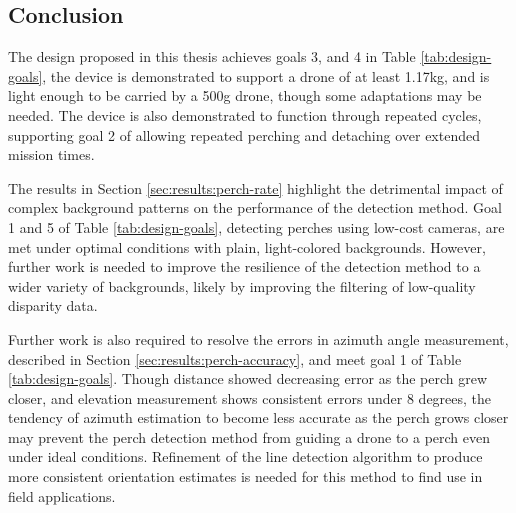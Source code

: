 \subsection{Conclusion}

The design proposed in this thesis achieves goals 3, and 4 in Table \ref{tab:design-goals}, the device is demonstrated
to support a drone of at least 1.17kg, and is light enough to be carried by a 500g drone, though some adaptations may be needed.
The device is also demonstrated to function through repeated cycles, supporting goal 2 of allowing repeated perching and detaching 
over extended mission times.
 
The results in Section \ref{sec:results:perch-rate} highlight the detrimental impact of complex background patterns on the 
performance of the detection method. Goal 1 and 5 of Table \ref{tab:design-goals}, detecting perches using low-cost cameras,
are met under optimal conditions with plain, light-colored backgrounds. However, further work is needed to improve the 
resilience of the detection method to a wider variety of backgrounds, likely by improving the filtering of low-quality 
disparity data.

Further work is also required to resolve the errors in azimuth angle measurement, described in Section \ref{sec:results:perch-accuracy}, 
and meet goal 1 of Table \ref{tab:design-goals}. Though distance showed decreasing error as the perch grew closer, and elevation measurement
shows consistent errors under 8 degrees, the tendency of azimuth estimation to become less accurate as the perch grows closer may 
prevent the perch detection method from guiding a drone to a perch even under ideal conditions. Refinement of the line detection algorithm 
to produce more consistent orientation estimates is needed for this method to find use in field applications. 